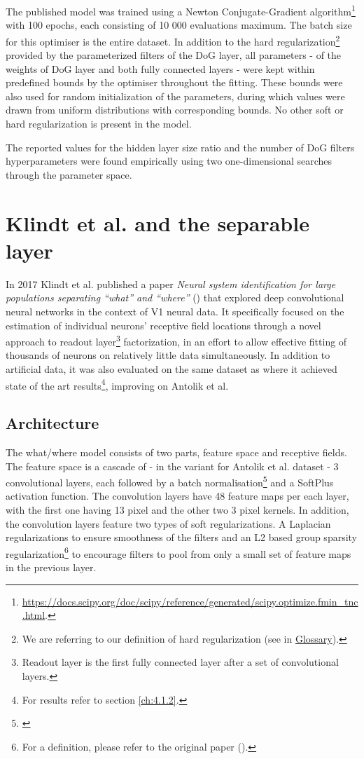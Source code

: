 The published model was trained using a Newton Conjugate-Gradient algorithm\footnote{\href{https://docs.scipy.org/doc/scipy/reference/generated/scipy.optimize.fmin_tnc.html}{https://docs.scipy.org/doc/scipy/reference/generated/scipy.optimize.fmin\_tnc.html}.} with 100 epochs, each consisting of 10 000 evaluations maximum. The batch size for this optimiser is the entire dataset. In addition to the hard regularization\footnote{We are referring to our definition of hard regularization (see in \hyperref[glos:hard-reg]{Glossary}).} provided by the parameterized filters of the DoG layer, all parameters - of the weights of DoG layer and both fully connected layers - were kept within predefined bounds by the optimiser throughout the fitting. These bounds were also used for random initialization of the parameters, during which values were drawn from uniform distributions with corresponding bounds. No other soft or hard regularization is present in the model. 

The reported values for the hidden layer size ratio and the number of DoG filters hyperparameters were found empirically using two one-dimensional searches through the parameter space.

\section{Klindt et al. and the separable layer}\label{ch:2.2}

In 2017 Klindt et al. published a paper \textit{Neural system identification for large populations separating “what” and “where”} (\cite{klidnt}) that explored deep convolutional neural networks in the context of V1 neural data. It specifically focused on the estimation of individual neurons’ receptive field locations through a novel approach to readout layer\footnote{Readout layer is the first fully connected layer after a set of convolutional layers.} factorization, in an effort to allow effective fitting of thousands of neurons on relatively little data simultaneously. In addition to artificial data, it was also evaluated on the same dataset as \cite{antolik} where it achieved state of the art results\footnote{For results refer to section \ref{ch:4.1.2}.}, improving on Antolik et al.

\subsection{Architecture}

The what/where model consists of two parts, feature space and receptive fields. The feature space is a cascade of - in the variant for Antolik et al. dataset - 3 convolutional layers, each followed by a batch normalisation\footnote{\cite{2015arXiv150203167I}} and a SoftPlus activation function. The convolution layers have 48 feature maps per each layer, with the first one having 13 pixel and the other two 3 pixel kernels. In addition, the convolution layers feature two types of soft regularizations. A Laplacian regularizations to ensure smoothness of the filters and an L2 based group sparsity regularization\footnote{For a definition, please refer to the original paper (\cite{klidnt}).} to encourage filters to pool from only a small set of feature maps in the previous layer.

